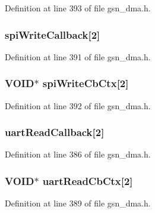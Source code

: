 Definition at line 393 of file gsn\_\-dma.h.

\hypertarget{a00049_ade41b4d2f83ca1006ff0d8f85da8ac8c}{
\subsubsection[{spiWriteCallback}]{ {\bf spiWriteCallback}\mbox{[}2\mbox{]}}}
\label{a00049_ade41b4d2f83ca1006ff0d8f85da8ac8c}


Definition at line 391 of file gsn\_\-dma.h.

\hypertarget{a00049_a4984962173c9e9fe0bd92332ea75a95e}{
\subsubsection[{spiWriteCbCtx}]{\setlength{\rightskip}{0pt plus 5cm}VOID$\ast$ {\bf spiWriteCbCtx}\mbox{[}2\mbox{]}}}
\label{a00049_a4984962173c9e9fe0bd92332ea75a95e}


Definition at line 392 of file gsn\_\-dma.h.

\hypertarget{a00049_a80249bc0f9f4b2856087049f02d7d3df}{
\subsubsection[{uartReadCallback}]{ {\bf uartReadCallback}\mbox{[}2\mbox{]}}}
\label{a00049_a80249bc0f9f4b2856087049f02d7d3df}


Definition at line 386 of file gsn\_\-dma.h.

\hypertarget{a00049_a814c350b43f8f659c433aaaac04a2d84}{
\subsubsection[{uartReadCbCtx}]{\setlength{\rightskip}{0pt plus 5cm}VOID$\ast$ {\bf uartReadCbCtx}\mbox{[}2\mbox{]}}}
\label{a00049_a814c350b43f8f659c433aaaac04a2d84}


Definition at line 389 of file gsn\_\-dma.h.

